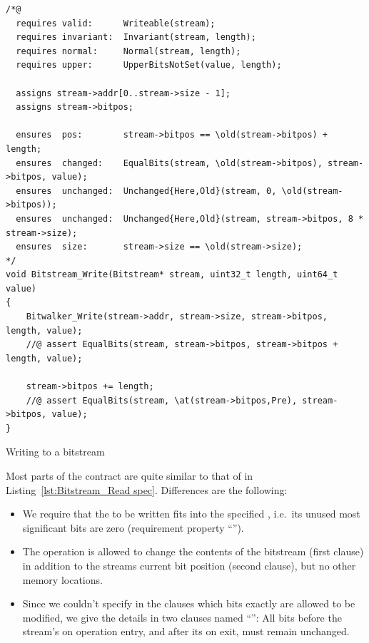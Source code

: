 \begin{listing}[hbt]
\begin{minipage}{0.99\textwidth}
\begin{lstlisting}[style=acsl-block]
/*@
  requires valid:      Writeable(stream);
  requires invariant:  Invariant(stream, length);
  requires normal:     Normal(stream, length);
  requires upper:      UpperBitsNotSet(value, length);

  assigns stream->addr[0..stream->size - 1];
  assigns stream->bitpos;

  ensures  pos:        stream->bitpos == \old(stream->bitpos) + length;
  ensures  changed:    EqualBits(stream, \old(stream->bitpos), stream->bitpos, value);
  ensures  unchanged:  Unchanged{Here,Old}(stream, 0, \old(stream->bitpos));
  ensures  unchanged:  Unchanged{Here,Old}(stream, stream->bitpos, 8 * stream->size);
  ensures  size:       stream->size == \old(stream->size);
*/
void Bitstream_Write(Bitstream* stream, uint32_t length, uint64_t value)
{
    Bitwalker_Write(stream->addr, stream->size, stream->bitpos, length, value);
    //@ assert EqualBits(stream, stream->bitpos, stream->bitpos + length, value);

    stream->bitpos += length;
    //@ assert EqualBits(stream, \at(stream->bitpos,Pre), stream->bitpos, value);
}

\end{lstlisting}
\end{minipage}
\caption{\label{lst:Bitstream_Write impl}Writing to a bitstream}
\end{listing}

\FloatBarrier

Most parts of the contract are quite similar to that of
 in
Listing~\ref{lst:Bitstream_Read spec}.
%
Differences are the following:
\begin{itemize}
\item We require that the  to be written fits into
	the specified
	, i.e.\ its unused most significant bits
	are zero (requirement property
	``'').
\item The operation is allowed to change the contents of the bitstream
	(first  clause) in addition to the streams
	current bit
	position (second  clause), but no other
	memory locations.
\item Since we couldn't specify in the  clauses 
	which bits exactly are allowed to be modified, we give the
	details in two
	 clauses named ``'':
	All bits before the stream's  on operation
	entry, and after
	its  on exit, must remain unchanged.
\end{itemize}

